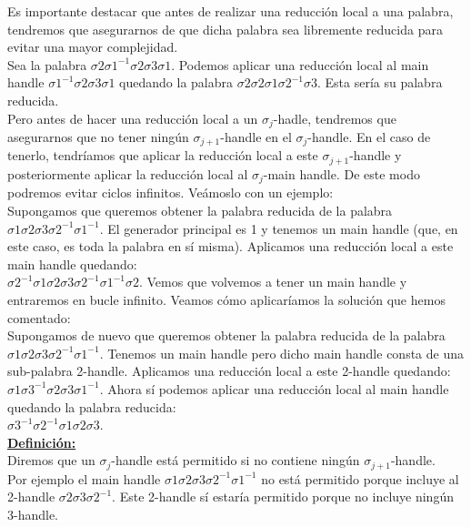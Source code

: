 Es importante destacar que antes de realizar una reducción local a una palabra, tendremos que asegurarnos de que dicha palabra sea libremente reducida para evitar una mayor complejidad.\\

Sea la palabra $\sigma2\sigma1^{-1}\sigma2\sigma3\sigma1$. Podemos aplicar una reducción local al main handle $\sigma1^{-1}\sigma2\sigma3\sigma1$ quedando la palabra $\sigma2\sigma2\sigma1\sigma2^{-1}\sigma3$. Esta sería su palabra reducida.\\

Pero antes de hacer una reducción local a un $\sigma_{j}$-hadle, tendremos que asegurarnos que no tener ningún $\sigma_{j+1}$-handle en el $\sigma_{j}$-handle. En el caso de tenerlo, tendríamos que aplicar la reducción local a este $\sigma_{j+1}$-handle y posteriormente aplicar la reducción local al $\sigma_{j}$-main handle. De este modo podremos evitar ciclos infinitos. Veámoslo con un ejemplo:\\

Supongamos que queremos obtener la palabra reducida de la palabra $\sigma1\sigma2\sigma3\sigma2^{-1}\sigma1^{-1}$. El generador principal es 1 y tenemos un main handle (que, en este caso, es toda la palabra en sí misma). Aplicamos una reducción local a este main handle quedando: \\
$\sigma2^{-1}\sigma1\sigma2\sigma3\sigma2^{-1}\sigma1^{-1}\sigma2$.
Vemos que volvemos a tener un main handle y entraremos en bucle infinito. Veamos cómo aplicaríamos la solución que hemos comentado:\\

Supongamos de nuevo que queremos obtener la palabra reducida de la palabra $\sigma1\sigma2\sigma3\sigma2^{-1}\sigma1^{-1}$. Tenemos un main handle pero dicho main handle consta de una sub-palabra 2-handle. Aplicamos una reducción local a este 2-handle quedando:\\
$\sigma1\sigma3^{-1}\sigma2\sigma3\sigma1^{-1}$. Ahora sí podemos aplicar una reducción local al main handle quedando la palabra reducida: \\
$\sigma3^{-1}\sigma2^{-1}\sigma1\sigma2\sigma3$.\\

\underline{\textbf{Definición:}} \\
Diremos que un  $\sigma_{j}$-handle está permitido si no contiene ningún $\sigma_{j+1}$-handle.\\

Por ejemplo el main handle $\sigma1\sigma2\sigma3\sigma2^{-1}\sigma1^{-1}$ no está permitido porque incluye al 2-handle $\sigma2\sigma3\sigma2^{-1}$. Este 2-handle sí estaría permitido porque no incluye ningún 3-handle. \\

